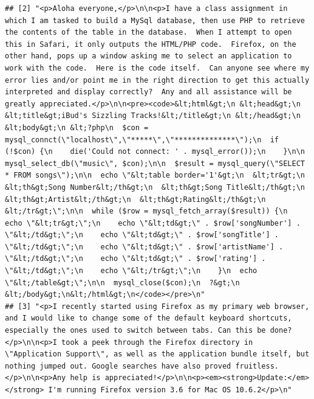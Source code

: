 \documentclass[
]{article}
\begin{document}
\begin{verbatim}
## [2] "<p>Aloha everyone,</p>\n\n<p>I have a class assignment in which I am tasked to build a MySql database, then use PHP to retrieve the contents of the table in the database.  When I attempt to open this in Safari, it only outputs the HTML/PHP code.  Firefox, on the other hand, pops up a window asking me to select an application to work with the code.  Here is the code itself.  Can anyone see where my error lies and/or point me in the right direction to get this actually interpreted and display correctly?  Any and all assistance will be greatly appreciated.</p>\n\n<pre><code>&lt;html&gt;\n &lt;head&gt;\n  &lt;title&gt;iBud's Sizzling Tracks!&lt;/title&gt;\n &lt;/head&gt;\n &lt;body&gt;\n &lt;?php\n  $con = mysql_connct(\"localhost\",\"*****\",\"**************\");\n  if (!$con) {\n    die('Could not connect: ' . mysql_error());\n    }\n\n  mysql_select_db(\"music\", $con);\n\n  $result = mysql_query(\"SELECT * FROM songs\");\n\n  echo \"&lt;table border='1'&gt;\n  &lt;tr&gt;\n  &lt;th&gt;Song Number&lt;/th&gt;\n  &lt;th&gt;Song Title&lt;/th&gt;\n  &lt;th&gt;Artist&lt;/th&gt;\n  &lt;th&gt;Rating&lt;/th&gt;\n  &lt;/tr&gt;\";\n\n  while ($row = mysql_fetch_array($result)) {\n    echo \"&lt;tr&gt;\";\n    echo \"&lt;td&gt;\" . $row['songNumber'] . \"&lt;/td&gt;\";\n    echo \"&lt;td&gt;\" . $row['songTitle'] . \"&lt;/td&gt;\";\n    echo \"&lt;td&gt;\" . $row['artistName'] . \"&lt;/td&gt;\";\n    echo \"&lt;td&gt;\" . $row['rating'] . \"&lt;/td&gt;\";\n    echo \"&lt;/tr&gt;\";\n    }\n  echo \"&lt;/table&gt;\";\n\n  mysql_close($con);\n  ?&gt;\n &lt;/body&gt;\n&lt;/html&gt;\n</code></pre>\n"
## [3] "<p>I recently started using Firefox as my primary web browser, and I would like to change some of the default keyboard shortcuts, especially the ones used to switch between tabs. Can this be done?</p>\n\n<p>I took a peek through the Firefox directory in \"Application Support\", as well as the application bundle itself, but nothing jumped out. Google searches have also proved fruitless.</p>\n\n<p>Any help is appreciated!</p>\n\n<p><em><strong>Update:</em></strong> I'm running Firefox version 3.6 for Mac OS 10.6.2</p>\n"                                                                                                                                                                                                                                                                                                                                                                                                                                                                                                                                                                                                                                                                                                                                                                                                                                                                                                                                                                                                                                                                                                                             

\end{verbatim}
\end{document}
